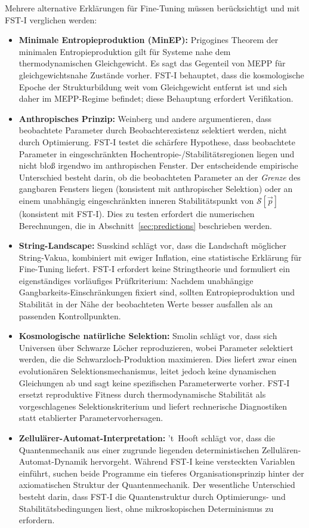 \documentclass[12pt,a4paper]{article}
\theoremstyle{remark}
\begin{document}
Mehrere alternative Erkl\"arungen f\"ur Fine-Tuning m\"ussen ber\"ucksichtigt und mit FST-I verglichen werden:

\begin{itemize}
    \item \textbf{Minimale Entropieproduktion (MinEP):} Prigogines Theorem der minimalen Entropieproduktion \citep{Prigogine1967} gilt f\"ur Systeme nahe dem thermodynamischen Gleichgewicht. Es sagt das Gegenteil von MEPP f\"ur gleichgewichtsnahe Zust\"ande vorher. FST-I behauptet, dass die kosmologische Epoche der Strukturbildung weit vom Gleichgewicht entfernt ist und sich daher im MEPP-Regime befindet; diese Behauptung erfordert Verifikation.
    \item \textbf{Anthropisches Prinzip:} Weinberg \citep{Weinberg1987} und andere argumentieren, dass beobachtete Parameter durch Beobachterexistenz selektiert werden, nicht durch Optimierung. FST-I testet die schärfere Hypothese, dass beobachtete Parameter in eingeschränkten Hochentropie-/Stabilitätsregionen liegen und nicht bloß irgendwo im anthropischen Fenster. Der entscheidende empirische Unterschied besteht darin, ob die beobachteten Parameter an der \emph{Grenze} des gangbaren Fensters liegen (konsistent mit anthropischer Selektion) oder an einem unabhängig eingeschränkten inneren Stabilitätspunkt von $\mathcal{S}[\vec{p}]$ (konsistent mit FST-I). Dies zu testen erfordert die numerischen Berechnungen, die in Abschnitt~\ref{sec:predictions} beschrieben werden.
    \item \textbf{String-Landscape:} Susskind \citep{Susskind2005} schlägt vor, dass die Landschaft möglicher String-Vakua, kombiniert mit ewiger Inflation, eine statistische Erklärung für Fine-Tuning liefert. FST-I erfordert keine Stringtheorie und formuliert ein eigenständiges vorläufiges Prüfkriterium: Nachdem unabhängige Gangbarkeits-Einschränkungen fixiert sind, sollten Entropieproduktion und Stabilität in der Nähe der beobachteten Werte besser ausfallen als an passenden Kontrollpunkten.
    \item \textbf{Kosmologische natürliche Selektion:} Smolin \citep{Smolin1992} schlägt vor, dass sich Universen über Schwarze Löcher reproduzieren, wobei Parameter selektiert werden, die die Schwarzloch-Produktion maximieren. Dies liefert zwar einen evolutionären Selektionsmechanismus, leitet jedoch keine dynamischen Gleichungen ab und sagt keine spezifischen Parameterwerte vorher. FST-I ersetzt reproduktive Fitness durch thermodynamische Stabilität als vorgeschlagenes Selektionskriterium und liefert rechnerische Diagnostiken statt etablierter Parametervorhersagen.
    \item \textbf{Zellulärer-Automat-Interpretation:} 't~Hooft \citep{tHooft2016} schlägt vor, dass die Quantenmechanik aus einer zugrunde liegenden deterministischen Zellulären-Automat-Dynamik hervorgeht. Während FST-I keine versteckten Variablen einführt, suchen beide Programme ein tieferes Organisationsprinzip hinter der axiomatischen Struktur der Quantenmechanik. Der wesentliche Unterschied besteht darin, dass FST-I die Quantenstruktur durch Optimierungs- und Stabilitätsbedingungen liest, ohne mikroskopischen Determinismus zu erfordern.
\end{itemize}
\end{document}
